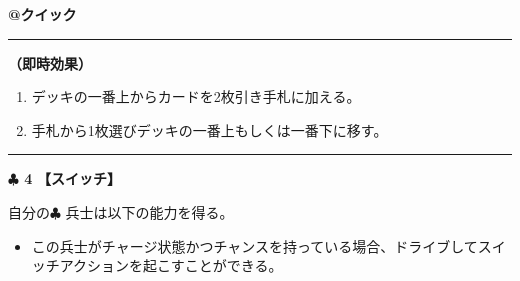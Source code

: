 \documentclass[twocolumn,a5paper,papersize,10pt]{jarticle}
\begin{document}
 
\begin{tcolorbox}[title={\small\bf【Action】先読み}{\scriptsize （兵士起因）}]

{\scriptsize\bf @クイック }

\vspace{1mm} %
\hrule height 0.1mm depth 0mm width 62mm %
\vspace{1mm} %

{\bf（即時効果）}


\vspace{-1zh}%
\begin{enumerate}
\setlength{\leftskip}{-0.3cm}
\setlength{\parskip}{0pt} %

\item デッキの一番上からカードを2枚引き手札に加える。

\item 手札から1枚選びデッキの一番上もしくは一番下に移す。
\vspace{-1zh}%
\end{enumerate}

\vspace{1mm} %
\end{tcolorbox}

\vspace{-1zh}

 
 
 

\vspace{3mm} %
\hrule height 0.5mm depth 0mm width 66.5mm %
\vspace{1mm} %
{\Large\bf $\clubsuit$ 4} {\normalsize\bf【スイッチ】} %
\vspace{1mm} %

自分の{\normalsize $\clubsuit$} 兵士は以下の能力を得る。


\vspace{-1zh}%
\begin{itemize}
\setlength{\leftskip}{-0.3cm}
\setlength{\parskip}{0pt} %

\item この兵士がチャージ状態かつチャンスを持っている場合、ドライブしてスイッチアクションを起こすことができる。
\vspace{-1zh}%
\end{itemize}
\end{document}
